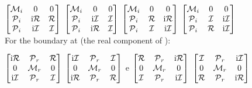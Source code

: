 \documentclass[]{iucr}              %
\numberwithin{equation}{section}
\newcommand{\Imaginary}[0]{\mathcal{I}}
\newcommand{\Real}[0]{\mathcal{R}}
\begin{document}
	$\begin{bmatrix}
		\Minus{}_i	& 0					& 0 \\
		\Plus{}_i	&  \textrm{i}\Real{}	& \Real{} \\
		\Plus{}_i	& \textrm{i}\Imaginary{}	& \Imaginary{}
	\end{bmatrix}$
	$\begin{bmatrix}
		\Minus{}_i	& 0					& 0 \\
		\Plus{}_i	& \textrm{i}\Imaginary{}	& \Imaginary{} \\
		\Plus{}_i	&  \textrm{i}\Real{}	& \Imaginary{} \\
	\end{bmatrix}$ 
	$\begin{bmatrix}
		\Minus{}_i	& 0			& 0 \\
		\Plus{}_i	&  \Real{}	& \textrm{i}\Real{} \\
		\Plus{}_i	& \Imaginary{}		& \textrm{i}\Imaginary{}
	\end{bmatrix}	$
	$\begin{bmatrix}
		\Minus{}_i	& 0		& 0 \\
		\Plus{}_i	& \Imaginary{}	& \textrm{i}\Imaginary{} \\
		\Plus{}_i	&  \Real{}& \textrm{i}\Imaginary{} \\
	\end{bmatrix}$ \\
	
	For the boundary at \sii{} (the real component of \cii{}):
	
	$\begin{bmatrix}
		
		\textrm{i}\Real{}	& \Plus{}_r		& \Real{} \\
		0				& \Minus{}_r	& 0 \\
		\textrm{i}\Imaginary{}	& \Plus{}_r		& \Imaginary{}
	\end{bmatrix}$
	$\begin{bmatrix}
		\textrm{i}\Imaginary{}	& \Plus{}_r		&  \Imaginary{} \\
		0				& \Minus{}_r	& 0 \\
		\textrm{i}\Real{}	& \Plus{}_r		& \Real{} \\
	\end{bmatrix}$ e
	$\begin{bmatrix}
		\Real{}	&\Plus{}_r		&   \textrm{i}\Real{} \\
		0		& \Minus{}_r	&  0 \\
		\Imaginary{}	&\Plus{}_r		& \textrm{i}\Imaginary{}
	\end{bmatrix}	$ 
	$\begin{bmatrix}
		\Imaginary{}	& \Plus{}_r	& \textrm{i}\Imaginary{} \\
		0		&\Minus{}_r	&  0 \\
		\Real{}	& \Plus{}_r	&  \textrm{i}\Real{} \\
	\end{bmatrix}$ \\
	
\end{document}
